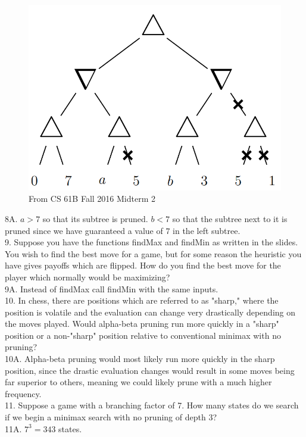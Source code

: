 \documentclass[12pt, letterpaper]{article}
\begin{document}
\begin{figure}[H]
    \centering
    \includegraphics[scale=0.3]{alpha-beta-prob.png}
    \caption*{From CS 61B Fall 2016 Midterm 2}
\end{figure}
8A. $a > 7$ so that its subtree is pruned. $b < 7$ so that the subtree next to it is pruned since we have guaranteed a value of $7$ in the left subtree. \\ 


9. Suppose you have the functions findMax and findMin as written in the slides. You wish to find the best move for a game, but for some reason the heuristic you have gives payoffs which are flipped. How do you find the best move for the player which normally would be maximizing? \\
9A. Instead of findMax call findMin with the same inputs. \\

10. In chess, there are positions which are referred to as "sharp," where the position is volatile and the evaluation can change very drastically depending on the moves played. Would alpha-beta pruning run more quickly in a "sharp" position or a non-"sharp" position relative to conventional minimax with no pruning? \\
10A. Alpha-beta pruning would most likely run more quickly in the sharp position, since the drastic evaluation changes would result in some moves being far superior to others, meaning we could likely prune with a much higher frequency. \\

11. Suppose a game with a branching factor of 7. How many states do we search if we begin a minimax search with no pruning of depth 3? \\
11A. $7^3 = 343$ states. \\
\end{document}
